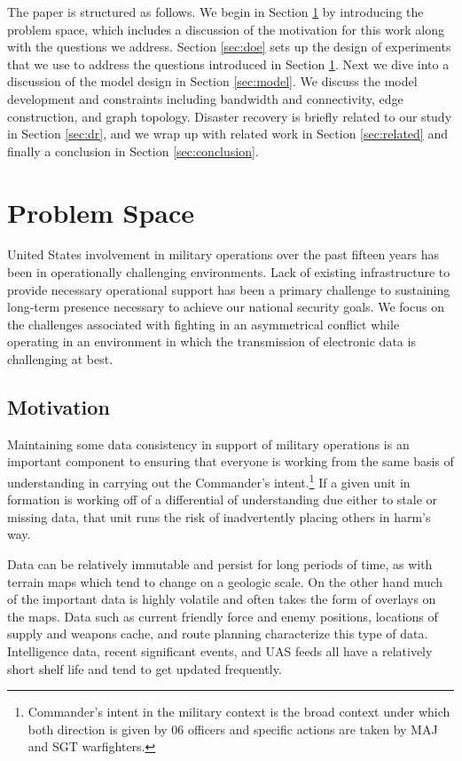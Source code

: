 \documentclass[10pt]{./IEEEtran}
\begin{document}
The paper is structured as follows.  We begin in Section \ref{sec:probspace} by introducing the problem space, which includes a discussion of the motivation for this work along with the questions we address.  Section \ref{sec:doe} sets up the design of experiments that we use to address the questions introduced in Section \ref{sec:probspace}.  Next we dive into a discussion of the model design in Section \ref{sec:model}.  We discuss the model development and constraints including bandwidth and connectivity, edge construction, and graph topology.  Disaster recovery is briefly related to our study in Section \ref{sec:dr}, and we wrap up with related work in Section \ref{sec:related} and finally a conclusion in Section \ref{sec:conclusion}.


\section{Problem Space}
\label{sec:probspace}
United States involvement in military operations over the past fifteen years has been in operationally challenging environments.  Lack of existing infrastructure to provide necessary operational support has been a primary challenge to sustaining long-term presence necessary to achieve our national security goals.  We focus on the challenges associated with fighting in an asymmetrical conflict while operating in an environment in which the transmission of electronic data is challenging at best.

\subsection{Motivation}
Maintaining some data consistency in support of military operations is an important component to ensuring that everyone is working from the same basis of understanding in carrying out the Commander's intent.\footnote{Commander's intent in the military context is the broad context under which both direction is given by 06 officers and specific actions are taken by MAJ and SGT warfighters.}  If a given unit in formation is working off of a differential of understanding due either to stale or missing data, that unit runs the risk of inadvertently placing others in harm's way.

Data can be relatively immutable and persist for long periods of time, as with terrain maps which tend to change on a geologic scale.  On the other hand much of the important data is highly volatile and often takes the form of overlays on the maps.  Data such as current friendly force and enemy positions, locations of supply and weapons cache, and route planning characterize this type of data.  Intelligence data, recent significant events, and UAS feeds all have a relatively short shelf life and tend to get updated frequently.
\end{document}
